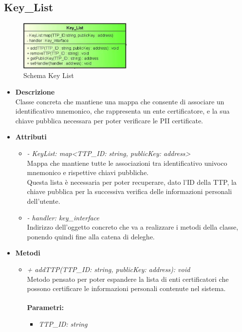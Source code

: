 \subsection{Key\_List}
\begin{figure}[!h]
	\centering
	\includegraphics[width=0.5\textwidth]{immagini/keylistData}
	\caption{Schema Key List}
\end{figure}
\begin{itemize}
	\item \textbf{Descrizione}\\
	Classe concreta che mantiene una mappa che consente di associare un identificativo mnemonico, che rappresenta un ente certificatore, e la sua chiave pubblica necessara per poter verificare le \gls{PII} certificate.
	\item \textbf{Attributi}
	\begin{itemize}
		\item \textit{- KeyList: map<TTP\_ID: string, publicKey: address>}\\
		Mappa che mantiene tutte le associazioni tra identificativo univoco mnemonico e rispettive chiavi pubbliche.\\
		Questa lista è necessaria per poter recuperare, dato l'ID della \gls{TTP}, la chiave pubblica per la successiva verifica delle informazioni personali dell'utente.
		\item \textit{- handler: key\_interface}\\
		Indirizzo dell'oggetto concreto che va a realizzare i metodi della classe, ponendo quindi fine alla catena di deleghe.		
	\end{itemize}
	\item \textbf{Metodi}
	\begin{itemize}
		\item \textit{+ addTTP(TTP\_ID: string, publicKey: address): void}\\
		Metodo pensato per poter espandere la lista di enti certificatori che possono certificare le informazioni personali contenute nel sistema.\\\\
		\textbf{Parametri:}
		\begin{itemize}
			\item \textit{TTP\_ID: string}\\

\end{itemize}
\end{itemize}
\end{itemize}
